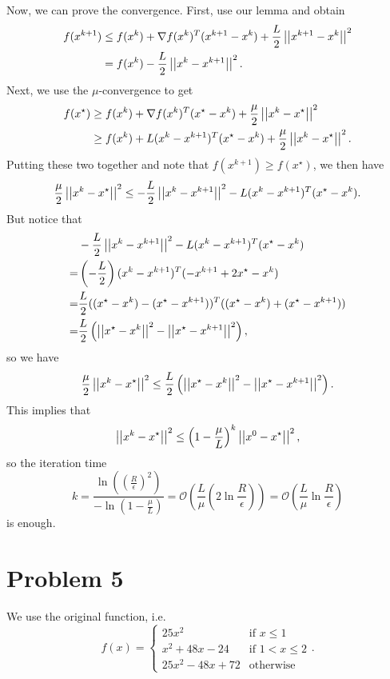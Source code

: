 \documentclass[a4 paper,12pt]{article}
\begin{document}
Now, we can prove the convergence. First, use our lemma and obtain
\begin{align*}
	f(x^{k+1})&\le f(x^k)+\nabla f(x^k)^T(x^{k+1}-x^k)+\frac{L}{2}\left|\left|x^{k+1}-x^k\right|\right|^2\\
	&= f(x^k)-\frac{L}{2}\left|\left|x^k-x^{k+1}\right|\right|^2.
\end{align*}
Next, we use the $\mu$-convergence to get
\begin{align*}
f(x^\star)&\ge f(x^k)+\nabla f(x^k)^T(x^\star-x^k)+\frac{\mu}{2}\left|\left|x^k-x^{\star}\right|\right|^2\\
&\ge f(x^k)+L(x^k-x^{k+1})^T(x^\star-x^k)+\frac{\mu}{2}\left|\left|x^k-x^{\star}\right|\right|^2.
\end{align*} Putting these two together and note that $f(x^{k+1})\ge f(x^{\star})$, we then have
\[
\frac{\mu}{2}\left|\left|x^k-x^\star\right|\right|^2\le -\frac{L}{2}\left|\left|x^k-x^{k+1}\right|\right|^2-L(x^k-x^{k+1})^T(x^\star-x^k).
\]
But notice that
\begin{align*}
&-\frac{L}{2}\left|\left|x^k-x^{k+1}\right|\right|^2-L(x^k-x^{k+1})^T(x^\star-x^k)\\ =&\left(-\frac{L}{2}\right)(x^k-x^{k+1})^T(-x^{k+1}+2x^\star-x^k)
\\ =&\frac{L}{2}((x^\star-x^k)-(x^\star-x^{k+1}))^T((x^\star-x^k)+(x^\star-x^{k+1}))\\
=& \frac{L}{2}\left(\left|\left|x^\star-x^k\right|\right|^2-\left|\left|x^\star-x^{k+1}\right|\right|^2\right),
\end{align*}
so we have
\[
\frac{\mu}{2}\left|\left|x^k-x^\star\right|\right|^2\le \frac{L}{2}\left(\left|\left|x^\star-x^k\right|\right|^2-\left|\left|x^\star-x^{k+1}\right|\right|^2\right).
\] This implies that 
\[
\left|\left|x^k-x^\star\right|\right|^2\le \left(1-\frac{\mu}{L}\right)^k\left|\left|x^0-x^\star\right|\right|^2,	
\] so the iteration time
\[
k=\frac{\ln\left(\left(\frac{R}{\epsilon}\right)^2\right)}{-\ln\left(1-\frac{\mu}{L}\right)}=\mathcal{O}\left(\frac{L}{\mu}\left(2\ln \frac{R}{\epsilon}\right)\right)=\mathcal{O}\left(\frac{L}{\mu}\ln \frac{R}{\epsilon}\right)
\] is enough.

\section*{Problem 5}
We use the original function, i.e.
\[
f(x)=\begin{cases}
	25x^2&\text{if } x\le 1\\
	x^2+48x-24&\text{if }1<x\le 2\\
	25x^2-48x+72&\text{otherwise}
\end{cases}	.
\]
\end{document}
